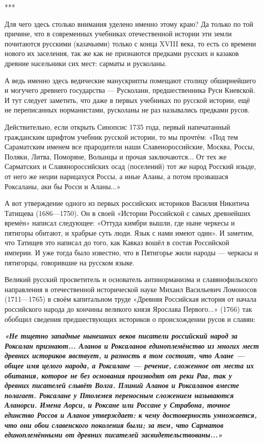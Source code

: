 ***

Для чего здесь столько внимания уделено именно этому краю? Да только по той
причине, что в современных учебниках отечественной истории эти земли почитаются
русскими (казачьими) только с конца XVIII века, то есть со времени нового их
заселения, так же как не признаются предками русских и казаков древние
насельники сих мест: сарматы и русколаны.

А ведь именно здесь ведические манускрипты помещают столицу обширнейшего и
могучего древнего государства — Русколани, предшественника Руси Киевской. И тут
следует заметить, что даже в первых учебниках по русской истории, ещё не
переписанных норманистами, русколаны не раз назывались предками русов.

Действительно, если открыть Синопсис 1735 года, первый напечатанный гражданским
шрифтом учебник русской истории, то мы прочтём: «Под тем Сараматским именем все
прародители наши Славенороссийские, Москва, Россы, Поляки, Литва, Поморяне,
Волынцы и прочая заключаются... От тех же Сарматских и Славянороссийских осад
(поселений) тот же народ Росский изыде, от него же неции нарицахуся Россы, а
иные Аланы, а потом прозвашася Роксаланы, аки бы Росси и Аланы...»

А вот утверждение одного из первых российских историков Василия Никитича
Татищева (1686—1750). Он в своей «Истории Российской с самых древнейших времён»
написал следующее: «Оттуда кимбри вышли, где ныне черкесы и пятигоры обитают, и
храбрые суть люди. Язык с нами имеют один». И заметим, что Татищев это написал
до того, как Кавказ вошёл в состав Российской империи. И уже тогда было
известно, что в Пятигорье жили народы — черкасы и пятигорцы, говорившие на
русском языке.

Великий русский просветитель и основатель антинорманизма и славянофильского
направления в отечественной исторической науке Михаил Васильевич Ломоносов
(1711—1765) в своём капитальном труде «Древняя Российская история от начала
российского народа до кончины великого князя Ярослава Первого...» (1766) так
обобщил сведения предшествующих историков о происхождении русов и славян: 

\begin{leftbar}
  \begingroup
    \em\large\bfseries\color{blue}
«Не тщетно западные нынешних веков писатели российский народ за Роксалан
признают... Аланов и Роксаланов единоплемёнство из многих мест древних
историков явствует, и разность в том состоит, что Алане — общее имя
целого народа, а Роксалане — речение, сложенное от места их обитания,
которое не без основания производят от реки Раа, так у древних
писателей слывёт Волга. Плиний Аланов и Роксаланов вместе полагает.
Роксалане у Птолемея переносным сложением называются Аланорси. Имена
Аорси, и Роксане или Россане у Страбона, точное единство Россов и
Аланов утверждает: к чему достоверность умножается, что они обои
славенского поколения были; за тем, что Сарматов единоплемёнными от
древних писателей засвидетельствованы...»
  \endgroup
\end{leftbar}

